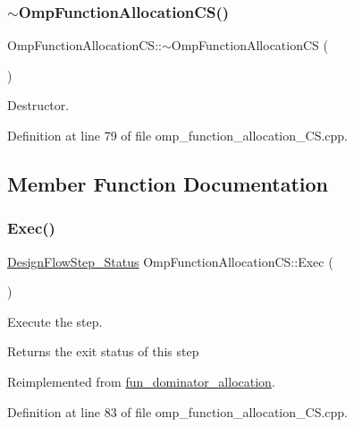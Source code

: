 \subsubsection{\texorpdfstring{$\sim$\+Omp\+Function\+Allocation\+C\+S()}{~OmpFunctionAllocationCS()}}
{\footnotesize\ttfamily Omp\+Function\+Allocation\+C\+S\+::$\sim$\+Omp\+Function\+Allocation\+CS (\begin{DoxyParamCaption}{ }\end{DoxyParamCaption})\hspace{0.3cm}{\ttfamily [virtual]}}



Destructor. 



Definition at line 79 of file omp\+\_\+function\+\_\+allocation\+\_\+\+C\+S.\+cpp.



\subsection{Member Function Documentation}
\mbox{\label{classOmpFunctionAllocationCS_a2a5a5321bfaefebcca2c4f290bb0d808}} 
\subsubsection{\texorpdfstring{Exec()}{Exec()}}
{\footnotesize\ttfamily \hyperlink{design__flow__step_8hpp_afb1f0d73069c26076b8d31dbc8ebecdf}{Design\+Flow\+Step\+\_\+\+Status} Omp\+Function\+Allocation\+C\+S\+::\+Exec (\begin{DoxyParamCaption}{ }\end{DoxyParamCaption})\hspace{0.3cm}{\ttfamily [virtual]}}



Execute the step. 

\begin{DoxyReturn}{Returns}
the exit status of this step 
\end{DoxyReturn}


Reimplemented from \hyperlink{classfun__dominator__allocation_aab3d1e1e5b22f40816fa73325bcab578}{fun\+\_\+dominator\+\_\+allocation}.



Definition at line 83 of file omp\+\_\+function\+\_\+allocation\+\_\+\+C\+S.\+cpp.



